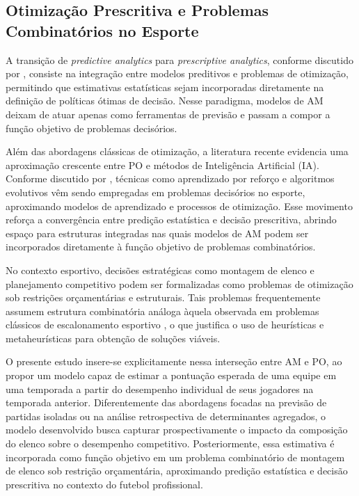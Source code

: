 \subsection{Otimização Prescritiva e Problemas Combinatórios no Esporte}

A transição de \textit{predictive analytics} para \textit{prescriptive analytics}, conforme discutido por \cite{Bertsimas2019}, 
consiste na integração entre modelos preditivos e problemas de otimização, permitindo que estimativas estatísticas sejam incorporadas 
diretamente na definição de políticas ótimas de decisão. Nesse paradigma, modelos de AM deixam de atuar apenas como ferramentas de previsão e 
passam a compor a função objetivo de problemas decisórios.

Além das abordagens clássicas de otimização, a literatura recente evidencia uma aproximação crescente entre PO e métodos de Inteligência Artificial (IA). 
Conforme discutido por \cite{Chmait2021}, técnicas como aprendizado por reforço e algoritmos evolutivos vêm sendo empregadas em problemas decisórios 
no esporte, aproximando modelos de aprendizado e processos de otimização. Esse movimento reforça a convergência entre predição estatística e decisão prescritiva, 
abrindo espaço para estruturas integradas nas quais modelos de AM podem ser incorporados diretamente à função objetivo de problemas combinatórios.

No contexto esportivo, decisões estratégicas como montagem de elenco e planejamento competitivo podem ser formalizadas como problemas de otimização 
sob restrições orçamentárias e estruturais. Tais problemas frequentemente assumem estrutura combinatória análoga àquela observada em problemas clássicos 
de escalonamento esportivo \cite{Kendall2010}, o que justifica o uso de heurísticas e metaheurísticas para obtenção de soluções viáveis.

O presente estudo insere-se explicitamente nessa interseção entre AM e PO, ao propor um modelo capaz de estimar a pontuação esperada de uma equipe em uma temporada 
a partir do desempenho individual de seus jogadores na temporada anterior. Diferentemente das abordagens focadas na previsão de partidas isoladas ou 
na análise retrospectiva de determinantes agregados, o modelo desenvolvido busca capturar prospectivamente o impacto da composição do elenco 
sobre o desempenho competitivo. Posteriormente, essa estimativa é incorporada como função objetivo em um problema combinatório de montagem de elenco 
sob restrição orçamentária, aproximando predição estatística e decisão prescritiva no contexto do futebol profissional.